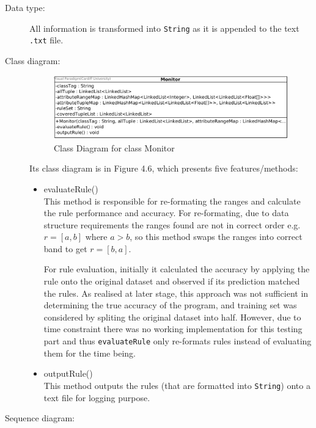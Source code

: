 \begin{description}
\item[Data type: ] All information is transformed into \texttt{String} as it is appended to the text \texttt{.txt} file. 

\item[Class diagram: ] 

\begin{figure}[h]
    \centering
    \includegraphics[width=5in]{figures/class_monitor}
    \caption[Class Diagram for class Monitor]{Class Diagram for class Monitor}
    \label{fig:figure4_6}
\end{figure}

Its class diagram is in Figure 4.6, which presents five features/methods:

\begin{itemize}
	\item{evaluateRule()} \\
	This method is responsible for re-formating the ranges and calculate the rule performance and accuracy. For re-formating, due to data structure requirements the ranges found are not in correct order e.g. $r = [a,b]$ where $a > b$, so this method swaps the ranges into correct band to get $r = [b,a]$.
	 
	For rule evaluation, initially it calculated the accuracy by applying the rule onto the original dataset and observed if its prediction matched the rules. As realised at later stage, this approach was not sufficient in determining the true accuracy of the program, and training set was considered by spliting the original dataset into half. However, due to time constraint there was no working implementation for this testing part and thus \texttt{evaluateRule} only re-formats rules instead of evaluating them for the time being.
	 
	\item{outputRule()} \\
	This method outputs the rules (that are formatted into \texttt{String}) onto a text file for logging purpose. 
	
\end{itemize}

\item[Sequence diagram: ] 


\end{description}
